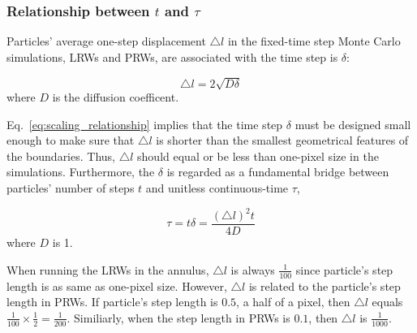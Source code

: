 \subsubsection{Relationship between $t$ and $\tau$}

Particles' average one-step displacement $\triangle l$ in the
fixed-time step Monte Carlo simulations, LRWs and PRWs, are associated
with the time step is $\delta$:

\begin{equation}\label{eq:scaling_relationship}
  \triangle l = 2 \sqrt{D \delta}
\end{equation}
where $D$ is the diffusion coefficent.

Eq.~\ref{eq:scaling_relationship} implies that the time step $\delta$
must be designed small enough to make sure that $\triangle l$ is
shorter than the smallest geometrical features of the
boundaries. Thus, $\triangle l$ should equal or be less than one-pixel
size in the simulations. Furthermore, the $\delta$ is regarded as a
fundamental bridge between particles' number of steps $t$ and unitless
continuous-time $\tau$,

\begin{equation}\label{eq:tau}
 \tau = t \delta = \frac{(\triangle l)^2 t}{4D}
\end{equation}
where $D$ is 1.

When running the LRWs in the annulus, $\triangle l$ is always
$\frac{1}{100}$ since particle's step length is as same as one-pixel
size. However, $\triangle l$ is related to the particle's step length
in PRWs. If particle's step length is $0.5$, a half of a pixel, then
$\triangle l$ equals $\frac{1}{100} \times \frac{1}{2} =
\frac{1}{200}$.  Similiarly, when the step length in PRWs is $0.1$,
then $\triangle l$ is $\frac{1}{1000}$. 
